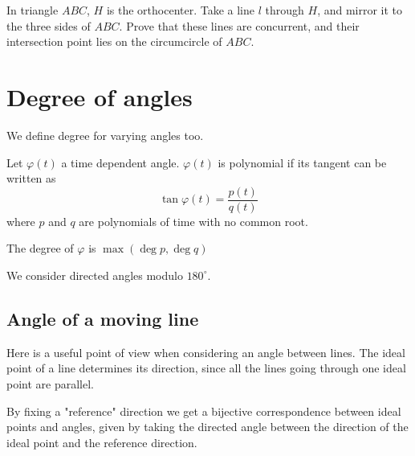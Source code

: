 \documentclass[a4paper]{article}
\begin{document}
\begin{exercise}[GIF 4.2.3]
    In triangle $ABC$, $H$ is the orthocenter. Take a line $l$ through $H$, and mirror it to the three sides of $ABC$. Prove that these lines are concurrent, and their intersection point lies on the circumcircle of $ABC$.
\end{exercise}

\section{Degree of angles}

We define degree for varying angles too.

\begin{definition}
    Let $\varphi(t)$ a time dependent angle.
    $\varphi(t)$ is polynomial if its tangent can be written as
    $$\tan \varphi(t)=\frac{p(t)}{q(t)}$$
    where $p$ and $q$ are polynomials of time with no common root.
    
    The degree of $\varphi$ is $\max (\deg p, \deg q)$
\end{definition}

\begin{remark}
    We consider directed angles modulo $180^\circ$.
\end{remark}

\subsection{Angle of a moving line}

Here is a useful point of view when considering an angle between lines. The ideal point of a line determines its direction, since all the lines going through one ideal point are parallel.

By fixing a "reference" direction we get a bijective correspondence between ideal points and angles, given by taking the directed angle between the direction of the ideal point and the reference direction.
\end{document}
